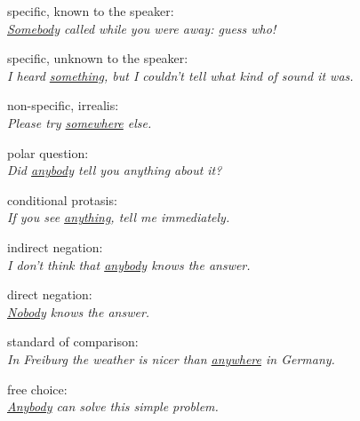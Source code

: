 \pex[labeltype=numeric]
\a specific, known to the speaker: \\ %
	\textit{\underline{Somebody} called while you were away: guess who!}
	
\a specific, unknown to the speaker: \\ %
	\textit{I heard \underline{something}, but I couldn't tell what kind of 
	sound it was.}
	
\a non-specific, irrealis: \\ %
	\textit{Please try \underline{somewhere} else.}
	
\a polar question: \\ %
	\textit{Did \underline{anybody} tell you anything about it?}
	
\a conditional protasis: \\ %
	\textit{If you see \underline{anything}, tell me immediately.}
	
\a indirect negation: \\ %
	\textit{I don't think that \underline{anybody} knows the answer.}
	
\a direct negation: \\ %
	\textit{\underline{Nobody} knows the answer.}
	
\a standard of comparison: \\ %
	\textit{In Freiburg the weather is nicer than \underline{anywhere} in 
	Germany.}
	
\a free choice: \\ %
	\textit{\underline{Anybody} can solve this simple problem.}
\xe

